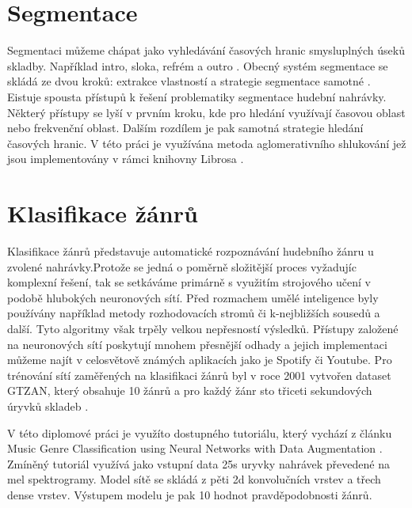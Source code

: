 \section{Segmentace} \label{sec:Teorie_Segmentace}
Segmentaci můžeme chápat jako vyhledávání časových hranic smysluplných úseků skladby. Například intro, sloka, refrém a outro \cite{Segmentation_introduction}. Obecný systém segmentace se skládá ze dvou kroků: extrakce vlastností a strategie segmentace samotné \cite{Multiclass_audio_segmentation}. Eistuje spousta přístupů k řešení problematiky segmentace hudební nahrávky. Některý přístupy se lyší v prvním kroku, kde pro hledání využívají časovou oblast nebo frekvenční oblast. Dalším rozdílem je pak samotná strategie hledání časových hranic. V této práci je využívána metoda aglomerativního shlukování jež jsou implementovány v rámci knihovny Librosa \cite{Librosa}.


\section{Klasifikace žánrů} \label{sec:Klasifikace_zanru}
Klasifikace žánrů představuje automatické rozpoznávání hudebního žánru u zvolené nahrávky.Protože se jedná o poměrně složitější proces vyžadujíc komplexní řešení, tak se setkáváme primárně s využitím strojového učení v podobě hlubokých neuronových sítí. Před rozmachem umělé inteligence byly používány například metody rozhodovacích stromů či k-nejbližších sousedů a další. Tyto algoritmy však trpěly velkou nepřesností výsledků. Přístupy založené na neuronových sítí poskytují mnohem přesnější odhady a jejich implementaci můžeme najít v celosvětově známých aplikacích jako je Spotify či Youtube\cite{Music_genre_classification}. 
Pro trénování sítí zaměřených na klasifikaci žánrů byl v roce 2001 vytvořen dataset GTZAN, který obsahuje 10 žánrů a pro každý žánr sto třiceti sekundových úryvků skladeb \cite{GTZAN}. 

V této diplomové práci je využíto dostupného tutoriálu, který vychází z článku Music Genre Classification using Neural Networks with Data Augmentation \cite{Music_classification_using_deep_learning, Music_genre_classification_paper}. Zmíněný tutoriál využívá jako vstupní data 25s uryvky nahrávek převedené na mel spektrogramy. Model sítě se skládá z pěti 2d konvolučních vrstev a třech dense vrstev. Výstupem modelu je pak 10 hodnot pravděpodobnosti žánrů.

